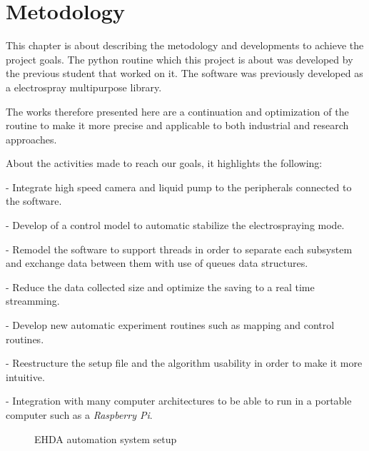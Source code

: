 \chapter{Metodology}
\label{chap:Metodology}

This chapter is about describing the metodology and developments to achieve the project goals. 
The python routine which this project is about was developed by the previous student that worked on it.\cite{Monica}
The software was previously developed as a electrospray multipurpose library\cite{Monica}. 

The works therefore presented here are a continuation and optimization of the routine to make it more precise and applicable to both industrial and research approaches.

About the activities made to reach our goals, it highlights the following:

- Integrate high speed camera and liquid pump to the peripherals connected to the software.

- Develop of a control model to automatic stabilize the electrospraying mode.

- Remodel the software to support threads in order to separate each subsystem and exchange data between them with use of queues data structures.

- Reduce the data collected size and optimize the saving to a real time streamming.

- Develop new automatic experiment routines such as mapping and control routines.

- Reestructure the setup file and the algorithm usability in order to make it more intuitive.

- Integration with many computer architectures to be able to run in a portable computer such as a \emph{Raspberry Pi}.
    
    \begin{figure}[H]
        \centering
        \caption{EHDA automation system setup}
        \label{fig:metodology_example1}
    \end{figure}

